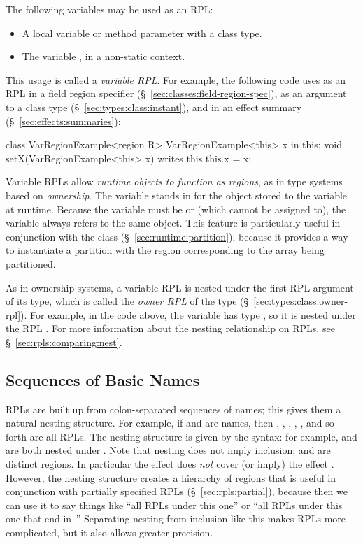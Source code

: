 The following variables may be used as an RPL:
%
\begin{itemize}
%
\item A  local variable or method parameter with a class
  type.
%
\item The variable , in a non-static context.
%
\end{itemize}
%
This usage is called a \emph{variable RPL}.  For example, the
following code uses  as an RPL in a field region specifier
(\S~\ref{sec:classes:field-region-spec}), as an argument to a class
type (\S~\ref{sec:types:class:instant}), and in an effect summary
(\S~\ref{sec:effects:summaries}):
%
\begin{dpjlisting}
class VarRegionExample<region R> {
  VarRegionExample<this> x in this;
  void setX(VarRegionExample<this> x) 
    writes this 
  {
    this.x = x;
  }
}
\end{dpjlisting}
%

Variable RPLs allow \emph{runtime objects to function as regions}, as
in type systems based on \emph{ownership}.  The variable stands in for
the object stored to the variable at runtime.  Because the variable
must be  or  (which cannot be assigned to), the
variable always refers to the same object.  This feature is
particularly useful in conjunction with the  class
(\S~\ref{sec:runtime:partition}), because it provides a way to
instantiate a partition with the region corresponding to the array
being partitioned.

As in ownership systems, a variable RPL is nested under the first RPL
argument of its type, which is called the \emph{owner RPL} of the type
(\S~\ref{sec:types:class:owner-rpl}).  For example, in the code above,
the variable  has type , so it is
nested under the RPL .  For more information about the nesting
relationship on RPLs, see \S~\ref{sec:rpls:comparing:nest}.


\subsection{Sequences of Basic Names%
\label{sec:rpls:sequences}}

RPLs are built up from colon-separated sequences of names; this gives
them a natural nesting structure.  For example, if  and 
are names, then , , , , ,
and so forth are all RPLs.  The nesting structure is given by the
syntax: for example,  and  are both nested under
.  Note that nesting does not imply inclusion;  and
 are distinct regions.  In particular the effect  does \emph{not} cover (or imply) the effect .
However, the nesting structure creates a hierarchy of regions that is
useful in conjunction with partially specified RPLs
(\S~\ref{sec:rpls:partial}), because then we can use it to say things
like ``all RPLs under this one'' or ``all RPLs under this one that end
in .''  Separating nesting from inclusion like this makes RPLs
more complicated, but it also allows greater precision.

